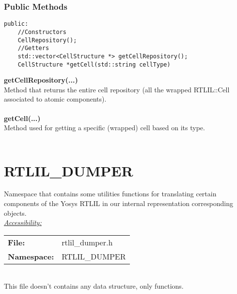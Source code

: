 \documentclass{article}
\newcommand{\sectionbreak}{\clearpage}
\begin{document}
\subsubsection{Public Methods}

\begin{mdframed}[hidealllines=true, backgroundcolor=magenta!10]
	\begin{lstlisting}[basicstyle=\tiny]
public:
	//Constructors
	CellRepository();
	//Getters
	std::vector<CellStructure *> getCellRepository();
	CellStructure *getCell(std::string cellType)
	\end{lstlisting}
\end{mdframed}

\textbf{getCellRepository(...)}\\
Method that returns the entire cell repository (all the wrapped RTLIL::Cell associated to atomic components).\\\\

\textbf{getCell(...)}\\
Method used for getting a specific (wrapped) cell based on its type.\\\\

\sectionbreak{\clearpage}


\section{RTLIL\_DUMPER}

Namespace that contains some utilities functions for translating certain components of the Yosys RTLIL in our internal representation corresponding objects.\\

\underline{\textit{\underline{Accessibility: }}}\\

\begin{tabular}{ll}
	\textbf{File:} & rtlil\_dumper.h\\
	\textbf{Namespace: } & RTLIL\_DUMPER\\
\end{tabular}\\

This file doesn't contains any data structure, only functions.
\end{document}
